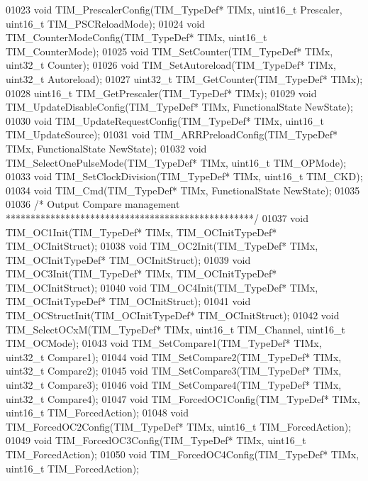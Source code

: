 \begin{DoxyCode}
01023 \textcolor{keywordtype}{void} TIM_PrescalerConfig(TIM\_TypeDef* TIMx, uint16\_t Prescaler, uint16\_t TIM\_PSCReloadMode);
01024 \textcolor{keywordtype}{void} TIM_CounterModeConfig(TIM\_TypeDef* TIMx, uint16\_t TIM\_CounterMode);
01025 \textcolor{keywordtype}{void} TIM_SetCounter(TIM\_TypeDef* TIMx, uint32\_t Counter);
01026 \textcolor{keywordtype}{void} TIM_SetAutoreload(TIM\_TypeDef* TIMx, uint32\_t Autoreload);
01027 uint32\_t TIM_GetCounter(TIM\_TypeDef* TIMx);
01028 uint16\_t TIM_GetPrescaler(TIM\_TypeDef* TIMx);
01029 \textcolor{keywordtype}{void} TIM_UpdateDisableConfig(TIM\_TypeDef* TIMx, FunctionalState NewState);
01030 \textcolor{keywordtype}{void} TIM_UpdateRequestConfig(TIM\_TypeDef* TIMx, uint16\_t TIM\_UpdateSource);
01031 \textcolor{keywordtype}{void} TIM_ARRPreloadConfig(TIM\_TypeDef* TIMx, FunctionalState NewState);
01032 \textcolor{keywordtype}{void} TIM_SelectOnePulseMode(TIM\_TypeDef* TIMx, uint16\_t TIM\_OPMode);
01033 \textcolor{keywordtype}{void} TIM_SetClockDivision(TIM\_TypeDef* TIMx, uint16\_t TIM\_CKD);
01034 \textcolor{keywordtype}{void} TIM_Cmd(TIM\_TypeDef* TIMx, FunctionalState NewState);
01035 
01036 \textcolor{comment}{/* Output Compare management **************************************************/}
01037 \textcolor{keywordtype}{void} TIM_OC1Init(TIM\_TypeDef* TIMx, TIM\_OCInitTypeDef* TIM\_OCInitStruct);
01038 \textcolor{keywordtype}{void} TIM_OC2Init(TIM\_TypeDef* TIMx, TIM\_OCInitTypeDef* TIM\_OCInitStruct);
01039 \textcolor{keywordtype}{void} TIM_OC3Init(TIM\_TypeDef* TIMx, TIM\_OCInitTypeDef* TIM\_OCInitStruct);
01040 \textcolor{keywordtype}{void} TIM_OC4Init(TIM\_TypeDef* TIMx, TIM\_OCInitTypeDef* TIM\_OCInitStruct);
01041 \textcolor{keywordtype}{void} TIM_OCStructInit(TIM\_OCInitTypeDef* TIM\_OCInitStruct);
01042 \textcolor{keywordtype}{void} TIM_SelectOCxM(TIM\_TypeDef* TIMx, uint16\_t TIM\_Channel, uint16\_t TIM\_OCMode);
01043 \textcolor{keywordtype}{void} TIM_SetCompare1(TIM\_TypeDef* TIMx, uint32\_t Compare1);
01044 \textcolor{keywordtype}{void} TIM_SetCompare2(TIM\_TypeDef* TIMx, uint32\_t Compare2);
01045 \textcolor{keywordtype}{void} TIM_SetCompare3(TIM\_TypeDef* TIMx, uint32\_t Compare3);
01046 \textcolor{keywordtype}{void} TIM_SetCompare4(TIM\_TypeDef* TIMx, uint32\_t Compare4);
01047 \textcolor{keywordtype}{void} TIM_ForcedOC1Config(TIM\_TypeDef* TIMx, uint16\_t TIM\_ForcedAction);
01048 \textcolor{keywordtype}{void} TIM_ForcedOC2Config(TIM\_TypeDef* TIMx, uint16\_t TIM\_ForcedAction);
01049 \textcolor{keywordtype}{void} TIM_ForcedOC3Config(TIM\_TypeDef* TIMx, uint16\_t TIM\_ForcedAction);
01050 \textcolor{keywordtype}{void} TIM_ForcedOC4Config(TIM\_TypeDef* TIMx, uint16\_t TIM\_ForcedAction);

\end{DoxyCode}
